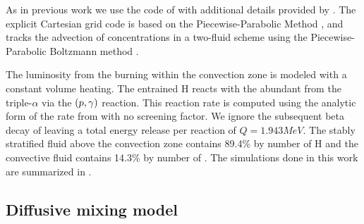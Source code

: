 \documentclass[fleqn,usenatbib]{mnras}
\newcommand{\cldfluid}{fluid above the convection zone}
\newcommand{\airfluid}{convective fluid}
\newcommand{\ppmstar}{\code{PPMstar}}
\begin{document}
As in previous work \citep{Herwig:2014cx,Jones:2017kc} we use the \ppmstar{}
code of \citet{woodward15} with additional details provided by
\citet{Andrassy:19}. The explicit Cartesian grid code is based on the
Piecewise-Parabolic Method \citep[PPM;][]{woodward_colella81,
woodward_colella84, colella_woodward84, woodward86, woodward07}, and tracks the
advection of concentrations in a two-fluid scheme using the Piecewise-Parabolic
Boltzmann method \citep[PPB;][]{woodward86,woodward15}.

The luminosity from the  burning within the convection zone is
modeled with a constant volume heating. The entrained H reacts with the abundant
 from the triple-$\alpha$ via the
$(p,\gamma)$ reaction. This reaction rate is
computed using the analytic form of the rate from \citet{angulo:99} with no
screening factor. We ignore the subsequent beta decay of  leaving
a total energy release per reaction of $Q = \unit{1.943}{MeV}$. The stably
stratified \cldfluid{} contains 89.4\% by
number of H and the \airfluid{} contains 14.3\% by
number of . The \ppmstar{} simulations done in this work are summarized
in .

\subsection{Diffusive mixing model}
\label{sec:Dmethod}
\end{document}
